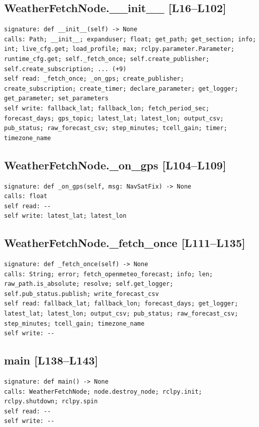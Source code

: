 \documentclass[a4paper,10pt,oneside]{book}
\begin{document}
\subsection*{WeatherFetchNode.\_\_init\_\_ [L16--L102]}
\begin{lstlisting}[numbers=none]
signature: def __init__(self) -> None
calls: Path; __init__; expanduser; float; get_path; get_section; info; int; live_cfg.get; load_profile; max; rclpy.parameter.Parameter; runtime_cfg.get; self._fetch_once; self.create_publisher; self.create_subscription; ... (+9)
self read: _fetch_once; _on_gps; create_publisher; create_subscription; create_timer; declare_parameter; get_logger; get_parameter; set_parameters
self write: fallback_lat; fallback_lon; fetch_period_sec; forecast_days; gps_topic; latest_lat; latest_lon; output_csv; pub_status; raw_forecast_csv; step_minutes; tcell_gain; timer; timezone_name
\end{lstlisting}
\subsection*{WeatherFetchNode.\_on\_gps [L104--L109]}
\begin{lstlisting}[numbers=none]
signature: def _on_gps(self, msg: NavSatFix) -> None
calls: float
self read: --
self write: latest_lat; latest_lon
\end{lstlisting}
\subsection*{WeatherFetchNode.\_fetch\_once [L111--L135]}
\begin{lstlisting}[numbers=none]
signature: def _fetch_once(self) -> None
calls: String; error; fetch_openmeteo_forecast; info; len; raw_path.is_absolute; resolve; self.get_logger; self.pub_status.publish; write_forecast_csv
self read: fallback_lat; fallback_lon; forecast_days; get_logger; latest_lat; latest_lon; output_csv; pub_status; raw_forecast_csv; step_minutes; tcell_gain; timezone_name
self write: --
\end{lstlisting}
\subsection*{main [L138--L143]}
\begin{lstlisting}[numbers=none]
signature: def main() -> None
calls: WeatherFetchNode; node.destroy_node; rclpy.init; rclpy.shutdown; rclpy.spin
self read: --
self write: --
\end{lstlisting}
\end{document}
